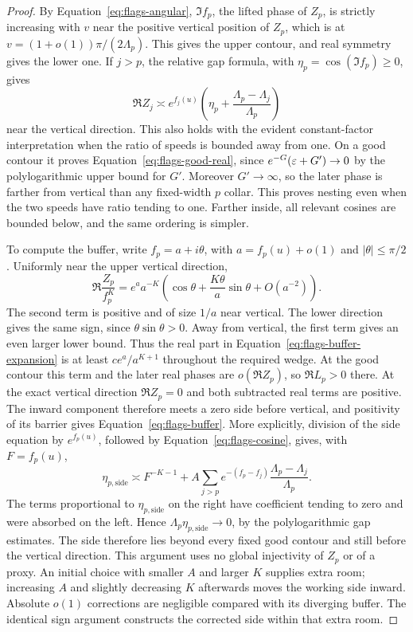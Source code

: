 \begin{proof}
By Equation~\eqref{eq:flags-angular}, $\Im f_p$, the lifted phase
of $Z_p$, is strictly increasing with $v$ near the positive
vertical position of $Z_p$,
which is at $v=(1+o(1))\pi/(2\Lambda_p)$. This gives the upper
contour, and real symmetry gives the lower one. If $j>p$, the
relative gap formula, with
$\eta_p=\cos(\Im f_p)\ge0$, gives
\begin{equation}\label{eq:flags-cosine}
 \Re Z_j\asymp e^{f_j(u)}
   \left(\eta_p+
               \frac{\Lambda_p-\Lambda_j}{\Lambda_p}\right)
\end{equation}
near the vertical direction. This also holds with the evident
constant-factor interpretation when the ratio of speeds is bounded
away from one. On a good contour it proves
Equation~\eqref{eq:flags-good-real}, since
$e^{-G}(\varepsilon+G')\to0$ by the polylogarithmic upper bound for
$G'$. Moreover $G'\to\infty$, so the later phase is farther from
vertical than any fixed-width $p$ collar. This proves nesting even
when the two speeds have ratio tending to one. Farther inside, all
relevant cosines are bounded below, and the same ordering is simpler.

To compute the buffer, write $f_p=a+i\theta$, with
$a=f_p(u)+o(1)$ and $|\theta|\le\pi/2$. Uniformly near the upper
vertical direction,
\begin{equation}\label{eq:flags-buffer-expansion}
 \Re\frac{Z_p}{f_p^K}
 =e^a a^{-K}\left(
   \cos\theta+\frac{K\theta}{a}\sin\theta+O(a^{-2})\right).
\end{equation}
The second term is positive and of size $1/a$ near vertical.
The lower direction gives the same sign, since
$\theta\sin\theta>0$. Away from vertical, the first term gives
an even larger lower bound. Thus the real part in
Equation~\eqref{eq:flags-buffer-expansion} is at least
$ce^a/a^{K+1}$ throughout the required wedge.
At the good contour this term and the later real phases are
$o(\Re Z_p)$, so $\Re L_p>0$ there. At the exact vertical
direction $\Re Z_p=0$ and both subtracted real terms are positive.
The inward component therefore meets a zero side before vertical,
and positivity of its barrier gives
Equation~\eqref{eq:flags-buffer}. More explicitly, division of the
side equation by $e^{f_p(u)}$, followed by
Equation~\eqref{eq:flags-cosine}, gives, with $F=f_p(u)$,
\[
 \eta_{p,\mathrm{side}}\asymp F^{-K-1}
   +A\sum_{j>p}e^{-(f_p-f_j)}
                    \frac{\Lambda_p-\Lambda_j}{\Lambda_p}.
\]
The terms proportional to $\eta_{p,\mathrm{side}}$ on the
right have coefficient tending to zero and were absorbed on the
left. Hence $\Lambda_p\eta_{p,\mathrm{side}}\to0$, by the
polylogarithmic gap estimates. The side therefore lies beyond
every fixed good contour and still before the vertical direction.
This argument uses no global
injectivity of $Z_p$ or of a proxy. An initial choice with smaller
$A$ and larger $K$ supplies extra room; increasing $A$ and slightly
decreasing $K$ afterwards moves the working side inward. Absolute
$o(1)$ corrections are negligible compared with its diverging
buffer. The identical sign argument constructs the corrected side
within that extra room.


\end{proof}
